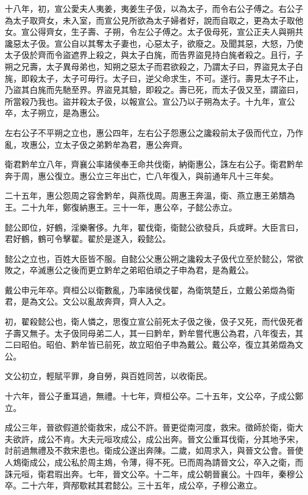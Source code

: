 十八年，初，宣公愛夫人夷姜，夷姜生子伋，以為太子，而令右公子傅之。右公子為太子取齊女，未入室，而宣公見所欲為太子婦者好，說而自取之，更為太子取他女。宣公得齊女，生子壽、子朔，令左公子傅之。太子伋母死，宣公正夫人與朔共讒惡太子伋。宣公自以其奪太子妻也，心惡太子，欲廢之。及聞其惡，大怒，乃使太子伋於齊而令盜遮界上殺之，與太子白旄，而告界盜見持白旄者殺之。且行，子朔之兄壽，太子異母弟也，知朔之惡太子而君欲殺之，乃謂太子曰，界盜見太子白旄，即殺太子，太子可毋行。太子曰，逆父命求生，不可。遂行。壽見太子不止，乃盜其白旄而先馳至界。界盜見其驗，即殺之。壽已死，而太子伋又至，謂盜曰，所當殺乃我也。盜并殺太子伋，以報宣公。宣公乃以子朔為太子。十九年，宣公卒，太子朔立，是為惠公。

左右公子不平朔之立也，惠公四年，左右公子怨惠公之讒殺前太子伋而代立，乃作亂，攻惠公，立太子伋之弟黔牟為君，惠公奔齊。

衛君黔牟立八年，齊襄公率諸侯奉王命共伐衛，納衛惠公，誅左右公子。衛君黔牟奔于周，惠公復立。惠公立三年出亡，亡八年復入，與前通年凡十三年矣。

二十五年，惠公怨周之容舍黔牟，與燕伐周。周惠王奔溫，衛、燕立惠王弟穨為王。二十九年，鄭復納惠王。三十一年，惠公卒，子懿公赤立。

懿公即位，好鶴，淫樂奢侈。九年，翟伐衛，衛懿公欲發兵，兵或畔。大臣言曰，君好鶴，鶴可令擊翟。翟於是遂入，殺懿公。

懿公之立也，百姓大臣皆不服。自懿公父惠公朔之讒殺太子伋代立至於懿公，常欲敗之，卒滅惠公之後而更立黔牟之弟昭伯頑之子申為君，是為戴公。

戴公申元年卒。齊桓公以衛數亂，乃率諸侯伐翟，為衛筑楚丘，立戴公弟燬為衛君，是為文公。文公以亂故奔齊，齊人入之。

初，翟殺懿公也，衛人憐之，思復立宣公前死太子伋之後，伋子又死，而代伋死者子壽又無子。太子伋同母弟二人，其一曰黔牟，黔牟嘗代惠公為君，八年復去，其二曰昭伯。昭伯、黔牟皆已前死，故立昭伯子申為戴公。戴公卒，復立其弟燬為文公。

文公初立，輕賦平罪，身自勞，與百姓同苦，以收衛民。

十六年，晉公子重耳過，無禮。十七年，齊桓公卒。二十五年，文公卒，子成公鄭立。

成公三年，晉欲假道於衛救宋，成公不許。晉更從南河度，救宋。徵師於衛，衛大夫欲許，成公不肯。大夫元咺攻成公，成公出奔。晉文公重耳伐衛，分其地予宋，討前過無禮及不救宋患也。衛成公遂出奔陳。二歲，如周求入，與晉文公會。晉使人鴆衛成公，成公私於周主鴆，令薄，得不死。已而周為請晉文公，卒入之衛，而誅元咺，衛君瑕出奔。七年，晉文公卒。十二年，成公朝晉襄公。十四年，秦穆公卒。二十六年，齊邴歜弒其君懿公。三十五年，成公卒，子穆公遫立。

